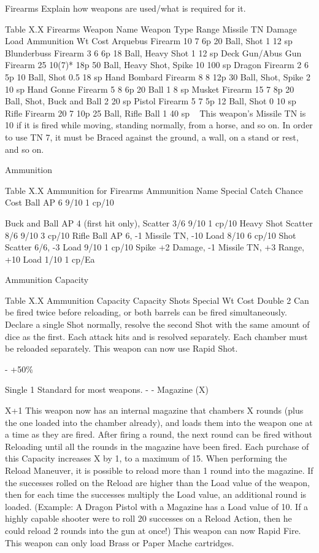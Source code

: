\documentclass[oneside,11pt,english]{book}
\begin{document}
 

Firearms 
Explain how weapons are used/what is required for it. 

 
Table X.X Firearms 
Weapon Name Weapon Type Range Missile TN Damage Load Ammunition Wt Cost 
Arquebus Firearm 10 7 6p 20 Ball, Shot 1 12 sp 
Blunderbuss Firearm 3 6 6p 18 Ball, Heavy Shot 1 12 sp 
Deck Gun/Abus Gun Firearm 25 10(7)* 18p 50 Ball, Heavy Shot, Spike 10 100 sp 
Dragon Firearm 2 6 5p 10 Ball, Shot 0.5 18 sp 
Hand Bombard Firearm 8 8 12p 30 Ball, Shot, Spike 2 10 sp 
Hand Gonne Firearm 5 8 6p 20 Ball 1 8 sp 
Musket Firearm 15 7 8p 20 Ball, Shot, Buck and Ball 2 20 sp 
Pistol Firearm 5 7 5p 12 Ball, Shot 0 10 sp 
Rifle Firearm 20 7 10p 25 Ball, Rifle Ball 1 40 sp 
~ This weapon’s Missile TN is 10 if it is fired while moving, standing normally, from a horse, and so on. In order to use TN 7, it 
must be Braced against the ground, a wall, on a stand or rest, and so on. 

 

Ammunition 

 
Table X.X Ammunition for Firearms 
Ammunition Name Special Catch Chance Cost 
Ball AP 6 9/10 1 cp/10 


Buck and Ball AP 4 (first hit only), Scatter 3/6 9/10 1 cp/10 
Heavy Shot Scatter 8/6 9/10 3 cp/10 
Rifle Ball AP 6, -1 Missile TN, -10 Load 8/10 6 cp/10 
Shot Scatter 6/6, -3 Load 9/10 1 cp/10 
Spike +2 Damage, -1 Missile TN, +3 Range, +10 Load 1/10 1 cp/Ea 

 
Ammunition Capacity 

 
Table X.X Ammunition Capacity 
Capacity Shots Special Wt Cost 
Double 2 Can be fired twice before reloading, or both barrels can be fired simultaneously. 
Declare a single Shot normally, resolve the second Shot with the same amount of 
dice as the first. Each attack hits and is resolved separately. Each chamber must be 
reloaded separately. 
This weapon can now use Rapid Shot. 

- +50\% 

Single 1 Standard for most weapons. - - 
Magazine 
(X) 

X+1 This weapon now has an internal magazine that chambers X rounds (plus the one 
loaded into the chamber already), and loads them into the weapon one at a time as 
they are fired. 
After firing a round, the next round can be fired without Reloading until all the 
rounds in the magazine have been fired. Each purchase of this Capacity increases X 
by 1, to a maximum of 15. 
When performing the Reload Maneuver, it is possible to reload more than 1 round 
into the magazine. If the successes rolled on the Reload are higher than the Load 
value of the weapon, then for each time the successes multiply the Load value, an 
additional round is loaded. (Example: A Dragon Pistol with a Magazine has a Load 
value of 10. If a highly capable shooter were to roll 20 successes on a Reload 
Action, then he could reload 2 rounds into the gun at once!) 
This weapon can now Rapid Fire. 
This weapon can only load Brass or Paper Mache cartridges. 
\end{document}
